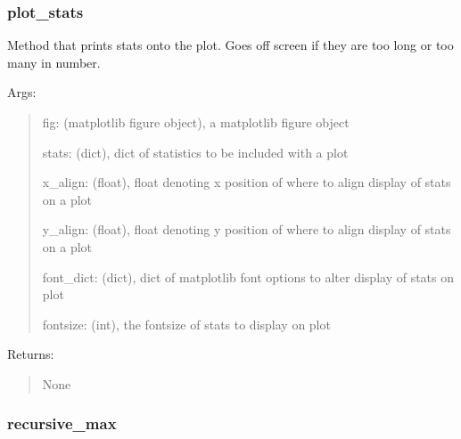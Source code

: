 \documentclass[letterpaper,10pt,english]{sphinxmanual}
\begin{document}
\subsubsection{plot\_stats}
\label{\detokenize{api/mastml.plots.plot_stats:plot-stats}}\label{\detokenize{api/mastml.plots.plot_stats::doc}}

\begin{fulllineitems}
\label{\detokenize{api/mastml.plots.plot_stats:mastml.plots.plot_stats}}
Method that prints stats onto the plot. Goes off screen if they are too long or too many in number.

Args:
\begin{quote}

fig: (matplotlib figure object), a matplotlib figure object

stats: (dict), dict of statistics to be included with a plot

x\_align: (float), float denoting x position of where to align display of stats on a plot

y\_align: (float), float denoting y position of where to align display of stats on a plot

font\_dict: (dict), dict of matplotlib font options to alter display of stats on plot

fontsize: (int), the fontsize of stats to display on plot
\end{quote}

Returns:
\begin{quote}

None
\end{quote}

\end{fulllineitems}



\subsubsection{recursive\_max}
\label{\detokenize{api/mastml.plots.recursive_max:recursive-max}}\label{\detokenize{api/mastml.plots.recursive_max::doc}}
\end{document}
